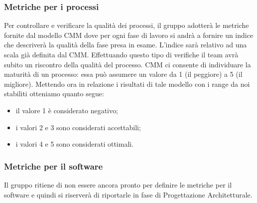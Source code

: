 \documentclass[../PianoDiQualifica.tex]{subfiles}
\begin{document}
			\subsubsection{Metriche per i processi}
			Per controllare e verificare la qualità dei processi, il gruppo adotterà le metriche fornite dal
			modello CMM dove per ogni fase di lavoro si andrà a fornire un indice che descriverà la
			qualità della fase presa in esame. L'indice sarà relativo ad una scala già definita dal CMM.
			Effettuando questo tipo di verifiche il team avrà subito un riscontro della qualità del processo. CMM ci consente di individuare la maturità di un processo: essa può assumere un valore da 1 (il
			peggiore) a 5 (il migliore). Mettendo ora in relazione i risultati di tale modello con i range da noi
			stabiliti otteniamo quanto segue:
			\begin{itemize}
			\item il valore 1 è considerato negativo;
			\item i valori 2 e 3 sono considerati accettabili;
			\item i valori 4 e 5 sono considerati ottimali.
			\end{itemize}
			\subsubsection{Metriche per il software}
			Il gruppo ritiene di non essere ancora pronto per definire le metriche per il software e quindi si riserverà di riportarle in fase di Progettazione Architetturale.
\end{document}
